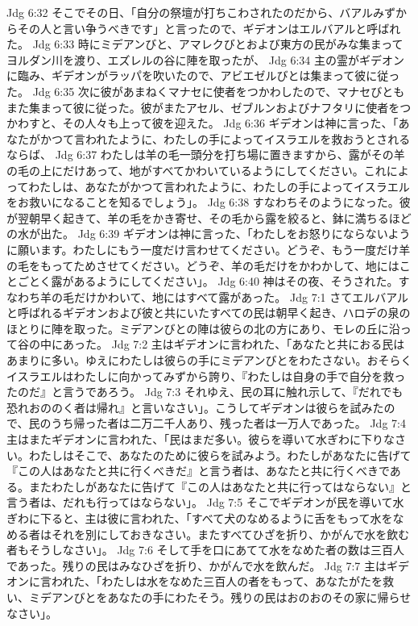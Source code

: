 Jdg 6:32  そこでその日、「自分の祭壇が打ちこわされたのだから、バアルみずからその人と言い争うべきです」と言ったので、ギデオンはエルバアルと呼ばれた。
Jdg 6:33  時にミデアンびと、アマレクびとおよび東方の民がみな集まってヨルダン川を渡り、エズレルの谷に陣を取ったが、
Jdg 6:34  主の霊がギデオンに臨み、ギデオンがラッパを吹いたので、アビエゼルびとは集まって彼に従った。
Jdg 6:35  次に彼があまねくマナセに使者をつかわしたので、マナセびともまた集まって彼に従った。彼がまたアセル、ゼブルンおよびナフタリに使者をつかわすと、その人々も上って彼を迎えた。
Jdg 6:36  ギデオンは神に言った、「あなたがかつて言われたように、わたしの手によってイスラエルを救おうとされるならば、
Jdg 6:37  わたしは羊の毛一頭分を打ち場に置きますから、露がその羊の毛の上にだけあって、地がすべてかわいているようにしてください。これによってわたしは、あなたがかつて言われたように、わたしの手によってイスラエルをお救いになることを知るでしょう」。
Jdg 6:38  すなわちそのようになった。彼が翌朝早く起きて、羊の毛をかき寄せ、その毛から露を絞ると、鉢に満ちるほどの水が出た。
Jdg 6:39  ギデオンは神に言った、「わたしをお怒りにならないように願います。わたしにもう一度だけ言わせてください。どうぞ、もう一度だけ羊の毛をもってためさせてください。どうぞ、羊の毛だけをかわかして、地にはことごとく露があるようにしてください」。
Jdg 6:40  神はその夜、そうされた。すなわち羊の毛だけかわいて、地にはすべて露があった。
Jdg 7:1  さてエルバアルと呼ばれるギデオンおよび彼と共にいたすべての民は朝早く起き、ハロデの泉のほとりに陣を取った。ミデアンびとの陣は彼らの北の方にあり、モレの丘に沿って谷の中にあった。
Jdg 7:2  主はギデオンに言われた、「あなたと共におる民はあまりに多い。ゆえにわたしは彼らの手にミデアンびとをわたさない。おそらくイスラエルはわたしに向かってみずから誇り、『わたしは自身の手で自分を救ったのだ』と言うであろう。
Jdg 7:3  それゆえ、民の耳に触れ示して、『だれでも恐れおののく者は帰れ』と言いなさい」。こうしてギデオンは彼らを試みたので、民のうち帰った者は二万二千人あり、残った者は一万人であった。
Jdg 7:4  主はまたギデオンに言われた、「民はまだ多い。彼らを導いて水ぎわに下りなさい。わたしはそこで、あなたのために彼らを試みよう。わたしがあなたに告げて『この人はあなたと共に行くべきだ』と言う者は、あなたと共に行くべきである。またわたしがあなたに告げて『この人はあなたと共に行ってはならない』と言う者は、だれも行ってはならない」。
Jdg 7:5  そこでギデオンが民を導いて水ぎわに下ると、主は彼に言われた、「すべて犬のなめるように舌をもって水をなめる者はそれを別にしておきなさい。またすべてひざを折り、かがんで水を飲む者もそうしなさい」。
Jdg 7:6  そして手を口にあてて水をなめた者の数は三百人であった。残りの民はみなひざを折り、かがんで水を飲んだ。
Jdg 7:7  主はギデオンに言われた、「わたしは水をなめた三百人の者をもって、あなたがたを救い、ミデアンびとをあなたの手にわたそう。残りの民はおのおのその家に帰らせなさい」。
